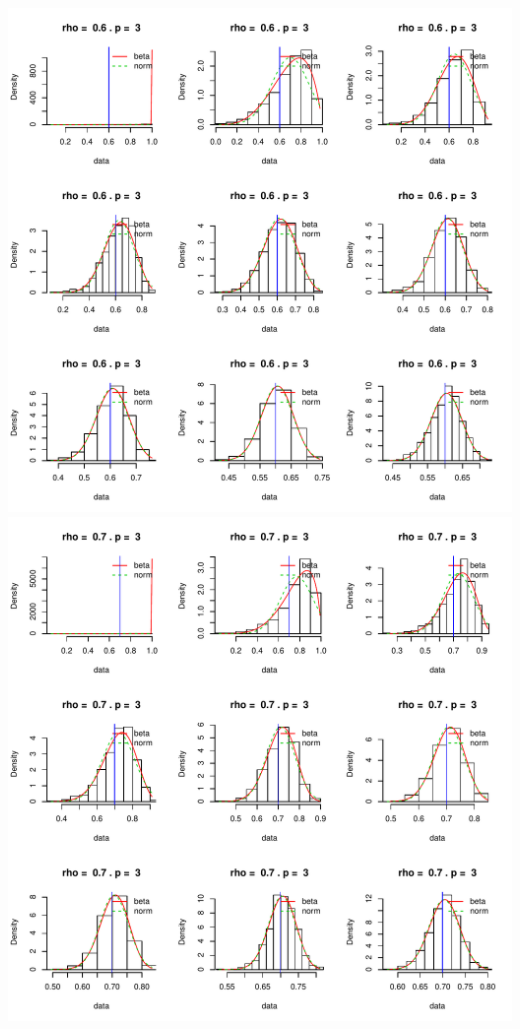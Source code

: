 \documentclass[]{article}
\begin{document}
\includegraphics{2016_w09_files/figure-latex/unnamed-chunk-15-7.pdf}
\includegraphics{2016_w09_files/figure-latex/unnamed-chunk-15-8.pdf}
\end{document}
